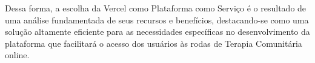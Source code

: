 Dessa forma, a escolha da Vercel como Plataforma como Serviço é o resultado de uma análise fundamentada de seus recursos e benefícios, destacando-se como uma solução altamente eficiente para as necessidades específicas no desenvolvimento da plataforma que facilitará o acesso dos usuários às rodas de Terapia Comunitária online.










